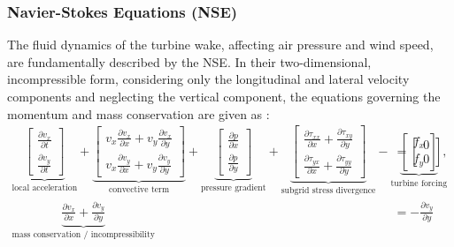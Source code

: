 \subsubsection{Navier-Stokes Equations (NSE)}
The fluid dynamics of the turbine wake, affecting air pressure and wind speed, are fundamentally described by the NSE. In their two-dimensional, incompressible form, considering only the longitudinal and lateral velocity components and neglecting the vertical component, the equations governing the momentum and mass conservation are given as \cite{boersma2018control}:
\begin{align*}
    \underbrace{
        \begin{bmatrix}
            \frac{\partial v_x}{\partial t} \\[1mm]
            \frac{\partial v_y}{\partial t}
        \end{bmatrix}
    }_{\text{local acceleration}}
    +
    \underbrace{
        \begin{bmatrix}
            v_x \frac{\partial v_x}{\partial x} + v_y \frac{\partial v_x}{\partial y} \\[1mm]
            v_x \frac{\partial v_y}{\partial x} + v_y \frac{\partial v_y}{\partial y}
        \end{bmatrix}
    }_{\text{convective term}}
    +
    \underbrace{
        \begin{bmatrix}
            \frac{\partial p}{\partial x} \\[1mm]
            \frac{\partial p}{\partial y}
        \end{bmatrix}
    }_{\text{pressure gradient}}
    +
    \underbrace{
        \begin{bmatrix}
            \frac{\partial \tau_{xx}}{\partial x} + \frac{\partial \tau_{xy}}{\partial y} \\[1mm]
            \frac{\partial \tau_{yx}}{\partial x} + \frac{\partial \tau_{yy}}{\partial y}
        \end{bmatrix}
    }_{\text{subgrid stress divergence}}
    -
    \underbrace{
        \begin{bmatrix}
            f_x \\[1mm]
            f_y
        \end{bmatrix}
    }_{\text{turbine forcing}}
    &= 
    \begin{bmatrix} 0 \\ 0 \end{bmatrix}, \\[2mm]
    \underbrace{\frac{\partial v_x}{\partial x} + \frac{\partial v_y}{\partial y}}_{\text{mass conservation / incompressibility}} &=   -\frac{\partial v_y}{\partial y}
\end{align*}

